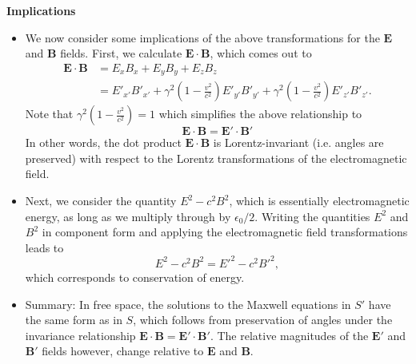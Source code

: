 \documentclass[11pt, a4paper]{article}
\renewcommand{\vec}[1]{\bm{#1}} %
\newcommand{\E}{\vec{E}} %
\newcommand{\B}{\vec{B}} %
\newcommand{\ee}{\epsilon_{0}}  %
\begin{document}
\textbf{Implications}
\begin{itemize}
	\item We now consider some implications of the above transformations for the $ \E $ and $ \B $ fields. First, we calculate $ \E \cdot \B $, which comes out to
	\begin{align*}
		\E \cdot \B &= E_{x}B_{x} + E_{y}B_{y} + E_{z}B_{z} \\
		& = E'_{x'}B'_{x'} + \gamma^{2}\left(1 - \frac{v^{2}}{c^{2}}\right)E'_{y'}B'_{y'} + \gamma^{2}\left(1 - \frac{v^{2}}{c^{2}}\right)E'_{z'}B'_{z'}.
	\end{align*}
	Note that $ \gamma^{2}(1 - \frac{v^{2}}{c^{2}}) = 1 $ which simplifies the above relationship to
	\begin{equation*}
		\E \cdot \B = \E' \cdot \B'
	\end{equation*}
    In other words, the dot product $ \E \cdot \B $ is Lorentz-invariant (i.e. angles are preserved) with respect to the Lorentz transformations of the electromagnetic field.
	
	\item Next, we consider the quantity $ E^{2} - c^{2}B^{2} $, which is essentially electromagnetic energy, as long as we multiply through by $ \ee/2 $. Writing the quantities $ E^{2} $ and $ B^{2} $ in component form and applying the electromagnetic field transformations leads to
	\begin{equation*}
		 E^{2} - c^{2}B^{2} =  E'^{2} - c^{2}B'^{2},
	\end{equation*}
	which corresponds to conservation of energy. 
	

    \item Summary: In free space, the solutions to the Maxwell equations in $ S' $ have the same form as in $ S $, which follows from preservation of angles under the invariance relationship $ \E \cdot \B = \E' \cdot \B' $. The relative magnitudes of the $ \E' $ and $ \B' $ fields however, change relative to $ \E $ and $ \B $.
\end{itemize}
\end{document}
